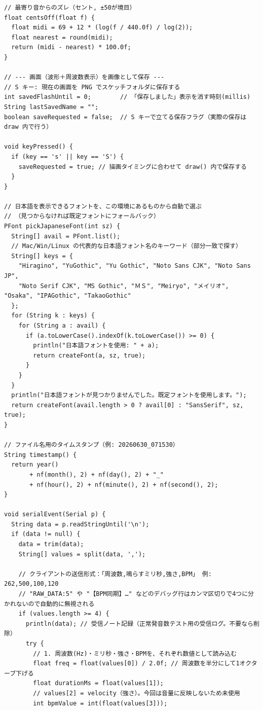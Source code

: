 \begin{lstlisting}
// 最寄り音からのズレ（セント, ±50が境目）
float centsOff(float f) {
  float midi = 69 + 12 * (log(f / 440.0f) / log(2));
  float nearest = round(midi);
  return (midi - nearest) * 100.0f;
}

// --- 画面（波形＋周波数表示）を画像として保存 ---
// S キー: 現在の画面を PNG でスケッチフォルダに保存する
int savedFlashUntil = 0;        // 「保存しました」表示を消す時刻(millis)
String lastSavedName = "";
boolean saveRequested = false;  // S キーで立てる保存フラグ（実際の保存は draw 内で行う）

void keyPressed() {
  if (key == 's' || key == 'S') {
    saveRequested = true; // 描画タイミングに合わせて draw() 内で保存する
  }
}

// 日本語を表示できるフォントを、この環境にあるものから自動で選ぶ
// （見つからなければ既定フォントにフォールバック）
PFont pickJapaneseFont(int sz) {
  String[] avail = PFont.list();
  // Mac/Win/Linux の代表的な日本語フォント名のキーワード（部分一致で探す）
  String[] keys = {
    "Hiragino", "YuGothic", "Yu Gothic", "Noto Sans CJK", "Noto Sans JP",
    "Noto Serif CJK", "MS Gothic", "ＭＳ", "Meiryo", "メイリオ", "Osaka", "IPAGothic", "TakaoGothic"
  };
  for (String k : keys) {
    for (String a : avail) {
      if (a.toLowerCase().indexOf(k.toLowerCase()) >= 0) {
        println("日本語フォントを使用: " + a);
        return createFont(a, sz, true);
      }
    }
  }
  println("日本語フォントが見つかりませんでした。既定フォントを使用します。");
  return createFont(avail.length > 0 ? avail[0] : "SansSerif", sz, true);
}

// ファイル名用のタイムスタンプ（例: 20260630_071530）
String timestamp() {
  return year()
       + nf(month(), 2) + nf(day(), 2) + "_"
       + nf(hour(), 2) + nf(minute(), 2) + nf(second(), 2);
}

void serialEvent(Serial p) {
  String data = p.readStringUntil('\n');
  if (data != null) {
    data = trim(data);
    String[] values = split(data, ',');

    // クライアントの送信形式：「周波数,鳴らすミリ秒,強さ,BPM」 例: 262,500,100,120
    // "RAW_DATA:5" や "【BPM同期】…" などのデバッグ行はカンマ区切りで4つに分かれないので自動的に無視される
    if (values.length >= 4) {
      println(data); // 受信ノート記録（正常発音数テスト用の受信ログ。不要なら削除）
      try {
        // 1. 周波数(Hz)・ミリ秒・強さ・BPMを、それぞれ数値として読み込む
        float freq = float(values[0]) / 2.0f; // 周波数を半分にして1オクターブ下げる
        float durationMs = float(values[1]);
        // values[2] = velocity（強さ）。今回は音量に反映しないため未使用
        int bpmValue = int(float(values[3]));


\end{lstlisting}
